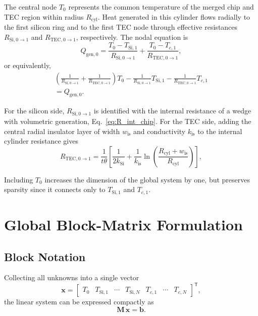 \documentclass[conference]{IEEEtran}
\begin{document}
The central node $T_0$ represents the common temperature of the merged chip and TEC region within radius $R_{\text{cyl}}$. Heat generated in this cylinder flows radially to the first silicon ring and to the first TEC node through effective resistances $R_{\text{Si},0\to1}$ and $R_{\text{TEC},0\to1}$, respectively. The nodal equation is
\begin{equation}
	Q_{\text{gen},0} = \frac{T_0 - T_{\text{Si},1}}{R_{\text{Si},0\to1}}
	+ \frac{T_0 - T_{c,1}}{R_{\text{TEC},0\to1}},
	\label{eq:T0_balance}
\end{equation}
or equivalently,
\begin{multline}
	\left( \frac{1}{R_{\text{Si},0\to1}} + \frac{1}{R_{\text{TEC},0\to1}} \right) T_0
	- \frac{1}{R_{\text{Si},0\to1}} T_{\text{Si},1}
	- \frac{1}{R_{\text{TEC},0\to1}} T_{c,1} \\ = Q_{\text{gen},0}.
	\label{eq:T0_coeff}
\end{multline}

For the silicon side, $R_{\text{Si},0\to1}$ is identified with the internal resistance of a wedge with volumetric generation, Eq.~\eqref{eq:R_int_chip}. For the TEC side, adding the central radial insulator layer of width $w_{\text{is}}$ and conductivity $k_{\text{is}}$ to the internal cylinder resistance gives
\begin{equation}
	R_{\text{TEC},0\to1} = \frac{1}{t \theta} \left[ \frac{1}{2 k_{\text{Si}}} + \frac{1}{k_{\text{is}}}
		\ln\!\left( \frac{R_{\text{cyl}} + w_{\text{is}}}{R_{\text{cyl}}} \right) \right],
	\label{eq:R_TEC_0_1}
\end{equation}

Including $T_0$ increases the dimension of the global system by one, but preserves sparsity since it connects only to $T_{\text{Si},1}$ and $T_{c,1}$.

\section{Global Block-Matrix Formulation}

\subsection*{Block Notation}

Collecting all unknowns into a single vector
\begin{equation}
	\mathbf{x} = \begin{bmatrix} T_0 & T_{\text{Si},1} & \cdots & T_{\text{Si},N} & T_{c,1} & \cdots & T_{c,N} \end{bmatrix}^{\!\mathsf{T}},
	\label{eq:x_vector}
\end{equation}
the linear system can be expressed compactly as
\begin{equation}
	\mathbf{M} \, \mathbf{x} = \mathbf{b}.
	\label{eq:Mx_b}
\end{equation}
\end{document}
